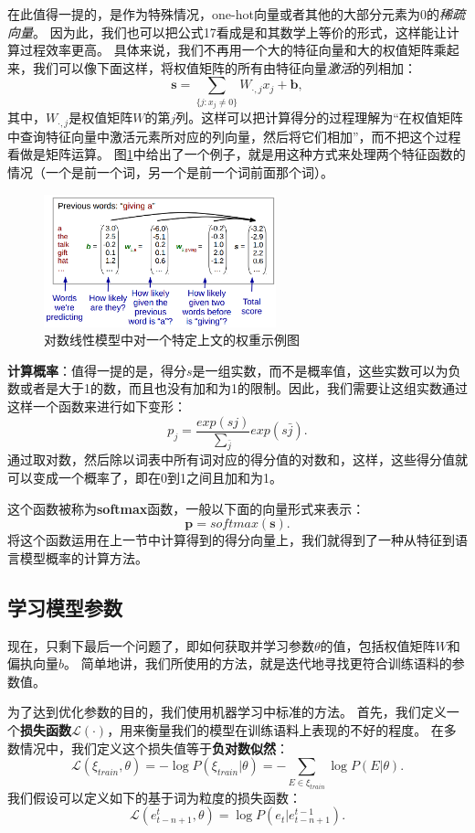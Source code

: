 \documentclass[10pt,a4paper]{ctexart}
\begin{document}
在此值得一提的，是作为特殊情况，one-hot向量或者其他的大部分元素为0的\textit{稀疏向量}。
因为此，我们也可以把公式17看成是和其数学上等价的形式，这样能让计算过程效率更高。
具体来说，我们不再用一个大的特征向量和大的权值矩阵乘起来，我们可以像下面这样，将权值矩阵的所有由特征向量\textit{激活}的列相加：
\[
 \textbf{s} = \sum_{\{j:x_j \neq 0\}} W_{\cdot,j}x_{j} + \textbf{b},
\]
其中，$W_{\cdot,j}$是权值矩阵$W$的第$j$列。这样可以把计算得分的过程理解为“在权值矩阵中查询特征向量中激活元素所对应的列向量，然后将它们相加”，而不把这个过程看做是矩阵运算。
图\ref{fig:5}中给出了一个例子，就是用这种方式来处理两个特征函数的情况（一个是前一个词，另一个是前一个词前面那个词）。

\begin{figure}[H]
\centering
\includegraphics[width=0.6\textwidth]{fig5.png}
\caption{对数线性模型中对一个特定上文的权重示例图}
\label{fig:5}
\end{figure}

\textbf{计算概率}：值得一提的是，得分\textbf{$s$}是一组实数，而不是概率值，这些实数可以为负数或者是大于1的数，而且也没有加和为1的限制。因此，我们需要让这组实数通过这样一个函数来进行如下变形：
\[
 p_{j} = \frac{exp(sj)}{\sum_{\bar{j}}}exp(s\bar{j}).
\]
通过取对数，然后除以词表中所有词对应的得分值的对数和，这样，这些得分值就可以变成一个概率了，即在0到1之间且加和为1。

这个函数被称为\textbf{softmax}函数，一般以下面的向量形式来表示：
\[
 \textbf{p} = softmax(\textbf{s}).
\]
将这个函数运用在上一节中计算得到的得分向量上，我们就得到了一种从特征到语言模型概率的计算方法。

\subsection{学习模型参数}
现在，只剩下最后一个问题了，即如何获取并学习参数$\theta$的值，包括权值矩阵$W$和偏执向量$b$。
简单地讲，我们所使用的方法，就是迭代地寻找更符合训练语料的参数值。

为了达到优化参数的目的，我们使用机器学习中标准的方法。
首先，我们定义一个\textbf{损失函数}$\mathcal{L}(\cdot)$，用来衡量我们的模型在训练语料上表现的不好的程度。
在多数情况中，我们定义这个损失值等于\textbf{负对数似然}：
\[
 \mathcal{L}( \xi_{train},\theta ) = - \log P(\xi_{train} | \theta ) = - \sum_{E \in \xi_{train}} \log P(E |\theta).
\]
我们假设可以定义如下的基于词为粒度的损失函数：
\[
 \mathcal{L}(e_{t-n+1}^{t},\theta) = \log P(e_t | e_{t-n+1}^{t-1}).
\]
\end{document}
